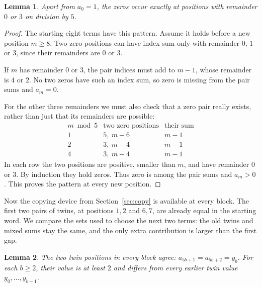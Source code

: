 \documentclass[11pt]{amsart}
\newtheorem{lemma}{Lemma}
\theoremstyle{remark}
\begin{document}
\begin{lemma}\label{lem:zeros}
Apart from $a_0=1$, the zeros occur exactly at positions with remainder $0$ or $3$ on division by $5$.
\end{lemma}

\begin{proof}
The starting eight terms have this pattern. Assume it holds before a new position $m\ge8$. Two zero positions can have index sum only with remainder $0$, $1$ or $3$, since their remainders are $0$ or $3$.

If $m$ has remainder $0$ or $3$, the pair indices must add to $m-1$, whose remainder is $4$ or $2$. No two zeros have such an index sum, so zero is missing from the pair sums and $a_m=0$.

For the other three remainders we must also check that a zero pair really exists, rather than just that its remainders are possible:
\[
\begin{array}{c|c|c}
m\bmod5 & \text{two zero positions} & \text{their sum}\\ \hline
1 & 5,\ m-6 & m-1\\
2 & 3,\ m-4 & m-1\\
4 & 3,\ m-4 & m-1
\end{array}
\]
In each row the two positions are positive, smaller than $m$, and have remainder $0$ or $3$. By induction they hold zeros. Thus zero is among the pair sums and $a_m>0$. This proves the pattern at every new position.
\end{proof}

Now the copying device from Section~\ref{sec:copy} is available at every block. The first two pairs of twins, at positions $1,2$ and $6,7$, are already equal in the starting word. We compare the sets used to choose the next two terms: the old twins and mixed sums stay the same, and the only extra contribution is larger than the first gap.

\begin{lemma}\label{lem:twins}
The two twin positions in every block agree: $a_{5b+1}=a_{5b+2}=y_b$. For each $b\ge2$, their value is at least $2$ and differs from every earlier twin value $y_0,\ldots,y_{b-1}$.
\end{lemma}
\end{document}
